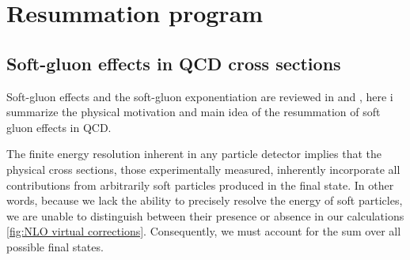 \documentclass[../main.tex]{subfiles}
\begin{document}
\chapter{Resummation program}\label{ch:resummation}

\section{Soft-gluon effects in QCD cross sections} \label{sec:Soft_gluon_effects}

Soft-gluon effects and the soft-gluon exponentiation are reviewed in \cite{Catani_1997} and \cite{catani1997softgluon}, here i summarize the physical 
motivation and main idea of the resummation of soft gluon effects in QCD.

The finite energy resolution inherent in any particle detector implies that the physical cross sections, 
those experimentally measured, inherently incorporate all contributions from arbitrarily soft particles 
produced in the final state. In other words, because we lack the ability to precisely resolve the energy 
of soft particles, we are unable to distinguish between their presence or absence in our calculations \cref{fig:NLO virtual corrections}. 
Consequently, we must account for the sum over all possible final states.
\end{document}

